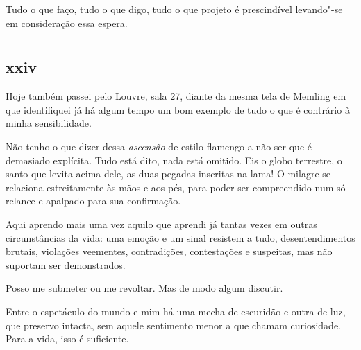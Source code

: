 Tudo o que faço, tudo o que digo, tudo o que projeto é
prescindível levando"-se em consideração essa espera.

\chapter*{}
\section{xxiv}

\noindent{}Hoje também passei pelo Louvre, sala 27, diante da mesma tela de
Memling em que identifiquei já há algum tempo um bom exemplo de tudo o
que é contrário à minha sensibilidade.

Não tenho o que dizer dessa \textit{ascensão} de estilo flamengo a não ser
que é demasiado explícita. Tudo está dito, nada está omitido. Eis o
globo terrestre, o santo que levita acima dele, as duas pegadas
inscritas na lama! O milagre se relaciona estreitamente às mãos e aos
pés, para poder ser compreendido num só relance e apalpado para sua
confirmação.

Aqui aprendo mais uma vez aquilo que aprendi já tantas vezes em outras
circunstâncias da vida: uma emoção e um sinal resistem a tudo,
desentendimentos brutais, violações veementes, contradições,
contestações e suspeitas, mas não suportam ser demonstrados.

Posso me submeter ou me revoltar. Mas de modo algum discutir.

Entre o espetáculo do mundo e mim há uma mecha de escuridão e outra de
luz, que preservo intacta, sem aquele sentimento menor a que chamam
curiosidade. Para a vida, isso é suficiente.

\pagebreak
\blankpage
\thispagestyle{empty}
